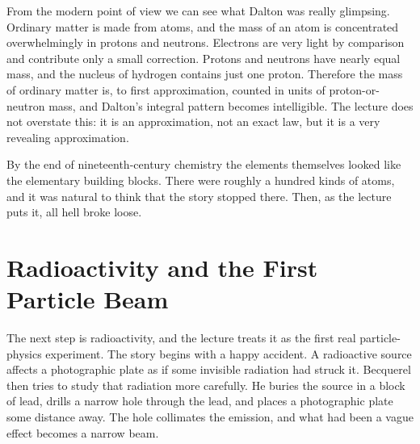 From the modern point of view we can see what Dalton was really glimpsing. Ordinary matter is made from atoms, and the mass of an atom is concentrated overwhelmingly in protons and neutrons. Electrons are very light by comparison and contribute only a small correction. Protons and neutrons have nearly equal mass, and the nucleus of hydrogen contains just one proton. Therefore the mass of ordinary matter is, to first approximation, counted in units of proton-or-neutron mass, and Dalton's integral pattern becomes intelligible. The lecture does not overstate this: it is an approximation, not an exact law, but it is a very revealing approximation.

By the end of nineteenth-century chemistry the elements themselves looked like the elementary building blocks. There were roughly a hundred kinds of atoms, and it was natural to think that the story stopped there. Then, as the lecture puts it, all hell broke loose.

\section{Radioactivity and the First Particle Beam}

The next step is radioactivity, and the lecture treats it as the first real particle-physics experiment. The story begins with a happy accident. A radioactive source affects a photographic plate as if some invisible radiation had struck it. Becquerel then tries to study that radiation more carefully. He buries the source in a block of lead, drills a narrow hole through the lead, and places a photographic plate some distance away. The hole collimates the emission, and what had been a vague effect becomes a narrow beam.

